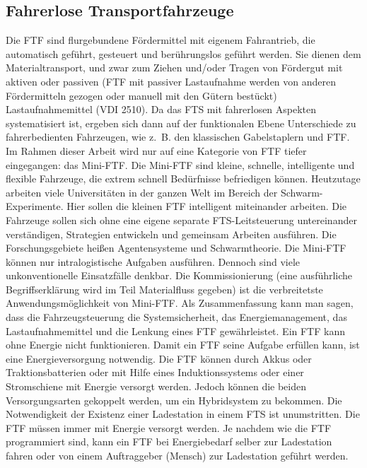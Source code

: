 \subsection{Fahrerlose Transportfahrzeuge}
Die FTF sind flurgebundene F\"ordermittel mit eigenem Fahrantrieb, die automatisch gef\"uhrt, gesteuert 
und ber\"uhrungslos gef\"uhrt werden. Sie dienen dem Materialtransport, und zwar zum Ziehen und/oder Tragen 
von F\"ordergut mit aktiven oder passiven (FTF mit passiver Lastaufnahme werden von anderen F\"ordermitteln 
gezogen oder manuell mit den G\"utern best\"uckt) Lastaufnahmemittel \cite{VDI:92}(VDI 2510). Da das FTS mit fahrerlosen 
Aspekten systematisiert ist, ergeben sich dann auf der funktionalen Ebene Unterschiede zu fahrerbedienten 
Fahrzeugen, wie z.~B. den klassischen Gabelstaplern und FTF. Im Rahmen dieser Arbeit wird nur auf eine 
Kategorie von FTF tiefer eingegangen: das Mini-FTF. Die Mini-FTF sind kleine, schnelle, intelligente 
und flexible Fahrzeuge, die extrem schnell Bed\"urfnisse befriedigen k\"onnen. Heutzutage arbeiten 
viele Universit\"aten in der ganzen Welt im Bereich der Schwarm-Experimente. Hier sollen die kleinen 
FTF intelligent miteinander arbeiten. Die Fahrzeuge sollen sich ohne eine eigene separate FTS-Leitsteuerung 
untereinander verst\"andigen, Strategien entwickeln und gemeinsam Arbeiten ausf\"uhren. Die Forschungsgebiete 
heißen Agentensysteme und Schwarmtheorie. Die Mini-FTF k\"onnen nur intralogistische Aufgaben ausf\"uhren. 
Dennoch sind viele unkonventionelle Einsatzf\"alle denkbar. Die Kommissionierung (eine ausf\"uhrliche 
Begriffserkl\"arung wird im Teil Materialfluss gegeben) ist die verbreitetste Anwendungsm\"oglichkeit von Mini-FTF\cite[vgl.][S. 105]{Guenther:2011}.
Als Zusammenfassung kann man sagen, dass die Fahrzeugsteuerung die Systemsicherheit, das Energiemanagement, 
das Lastaufnahmemittel und die Lenkung eines FTF gew\"ahrleistet. Ein FTF kann ohne Energie nicht funktionieren. 
Damit ein FTF seine Aufgabe erf\"ullen kann, ist eine Energieversorgung notwendig. Die FTF können durch Akkus oder 
Traktionsbatterien oder mit Hilfe eines Induktionssystems oder einer Stromschiene mit Energie versorgt werden. 
Jedoch k\"onnen die beiden Versorgungsarten gekoppelt werden, um ein Hybridsystem zu bekommen. Die Notwendigkeit 
der Existenz einer Ladestation in einem FTS ist unumstritten. Die FTF m\"ussen immer mit Energie versorgt werden. 
Je nachdem wie die FTF programmiert sind, kann ein FTF bei Energiebedarf selber zur Ladestation fahren oder von 
einem Auftraggeber (Mensch) zur Ladestation gef\"uhrt werden.

